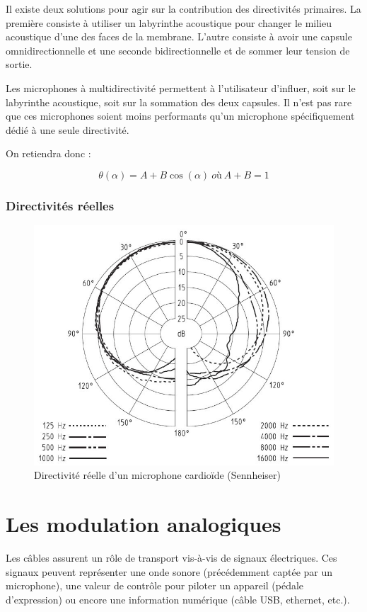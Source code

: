 \documentclass[
]{book}
\begin{document}
Il existe deux solutions pour agir sur la contribution des directivités primaires. La première consiste à utiliser un labyrinthe acoustique pour changer le milieu acoustique d'une des faces de la membrane. L'autre consiste à avoir une capsule omnidirectionnelle et une seconde bidirectionnelle et de sommer leur tension de sortie.

Les microphones à multidirectivité permettent à l'utilisateur d'influer, soit sur le labyrinthe acoustique, soit sur la sommation des deux capsules. Il n'est pas rare que ces microphones soient moins performants qu'un microphone spécifiquement dédié à une seule directivité.

On retiendra donc :

\[ \theta(\alpha) = A + B \cos (\alpha) \> où \> A + B = 1\]

\hypertarget{directivituxe9s-ruxe9elles}{%
\subsection{Directivités réelles}\label{directivituxe9s-ruxe9elles}}

\begin{figure}

{\centering \includegraphics[width=0.5\linewidth]{_resources/image_15} 

}

\caption{Directivité réelle d'un microphone cardioïde (Sennheiser)}\label{fig:unnamed-chunk-16}
\end{figure}

\hypertarget{les-modulation-analogiques}{%
\chapter{Les modulation analogiques}\label{les-modulation-analogiques}}

Les câbles assurent un rôle de transport vis-à-vis de signaux électriques. Ces signaux peuvent représenter une onde sonore (précédemment captée par un microphone), une valeur de contrôle pour piloter un appareil (pédale d'expression) ou encore une information numérique (câble USB, ethernet, etc.).
\end{document}

